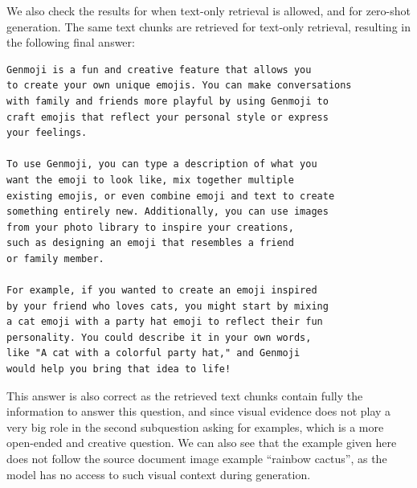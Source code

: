 We also check the results for when text-only retrieval is allowed, and for zero-shot generation.
The same text chunks are retrieved for text-only retrieval,
resulting in the following final answer:
\begin{verbatim}
Genmoji is a fun and creative feature that allows you 
to create your own unique emojis. You can make conversations 
with family and friends more playful by using Genmoji to 
craft emojis that reflect your personal style or express 
your feelings. 

To use Genmoji, you can type a description of what you 
want the emoji to look like, mix together multiple 
existing emojis, or even combine emoji and text to create 
something entirely new. Additionally, you can use images 
from your photo library to inspire your creations, 
such as designing an emoji that resembles a friend 
or family member.

For example, if you wanted to create an emoji inspired 
by your friend who loves cats, you might start by mixing 
a cat emoji with a party hat emoji to reflect their fun 
personality. You could describe it in your own words, 
like "A cat with a colorful party hat," and Genmoji 
would help you bring that idea to life!
\end{verbatim}
This answer is also correct as the retrieved text chunks contain fully the information to answer this question,
and since visual evidence does not play a very big role in the second subquestion asking for examples,
which is a more open-ended and creative question.
We can also see that the example given here does not follow the source document image example ``rainbow cactus'', 
as the model has no access to such visual context during generation.

